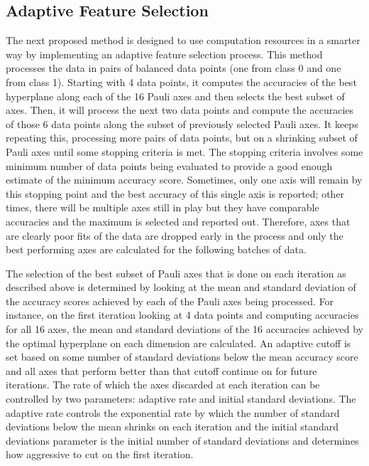 \documentclass[
	a4paper, %
	10pt, %
	unnumberedsections, %
	twoside, %
]{LTJournalArticle}
\begin{document}
\subsection{Adaptive Feature Selection}
The next proposed method is designed to use computation resources in a smarter way by implementing an adaptive feature selection process. This method processes the data in pairs of balanced 
data points (one from class 0 and one from class 1). Starting with 4 data points, it computes the accuracies of the best hyperplane along each of the 16 Pauli axes and then selects the 
best subset of axes. Then, it will process the next two data points and compute the accuracies of those 6 data points along the subset of previously selected Pauli axes. It keeps repeating 
this, processing more pairs of data points, but on a shrinking subset of Pauli axes until some stopping criteria is met. The stopping criteria involves some minimum number of data points 
being evaluated to provide a good enough estimate of the minimum accuracy score. Sometimes, only one axis will remain by this stopping point and the best accuracy of this single axis is 
reported; other times, there will be multiple axes still in play but they have comparable accuracies and the maximum is selected and reported out. Therefore, axes that are clearly poor 
fits of the data are dropped early in the process and only the best performing axes are calculated for the following batches of data.

The selection of the best subset of Pauli axes that is done on each iteration as described above is determined by looking at the mean and standard deviation of the accuracy scores achieved by 
each of the Pauli axes being processed. For instance, on the first iteration looking at 4 data points and computing accuracies for all 16 axes, the mean and standard deviations of the 16 
accuracies achieved by the optimal hyperplane on each dimension are calculated. An adaptive cutoff is set based on some number of standard deviations below the mean accuracy score and all 
axes that perform better than that cutoff continue on for future iterations. The rate of which the axes discarded at each iteration can be controlled by two parameters: adaptive rate and 
initial standard deviations. The adaptive rate controls the exponential rate by which the number of standard deviations below the mean shrinks on each iteration and the initial standard 
deviations parameter is the initial number of standard deviations and determines how aggressive to cut on the first iteration.
\end{document}
